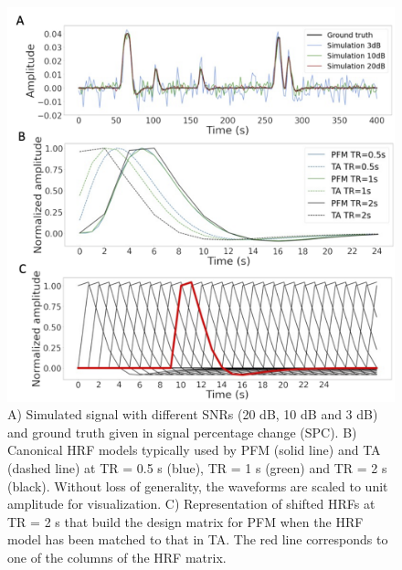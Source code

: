 \begin{figure}[t!]
    \begin{center}
        \includegraphics[width=0.75\columnwidth]{figures/synthesis_analysis/sim_and_hrf.png}
    \end{center}
    \caption{A) Simulated signal with different SNRs (20 dB, 10 dB and 3 dB) and ground truth given in signal percentage change (SPC). B) Canonical HRF models typically used by PFM (solid line) and TA (dashed line) at TR = 0.5 s (blue), TR = 1 s (green) and TR = 2 s (black). Without loss of generality, the waveforms are scaled to unit amplitude for visualization. C) Representation of shifted HRFs at TR = 2 s that build the design matrix for PFM when the HRF model has been matched to that in TA. The red line corresponds to one of the columns of the HRF matrix.}
\label{fig:sim_and_hrf}
\end{figure}

